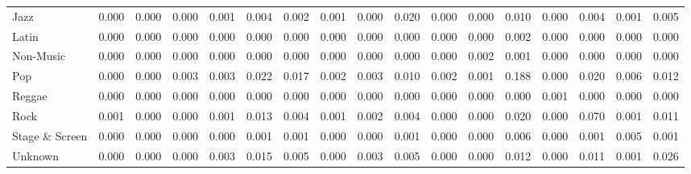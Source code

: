 \begin{table}
\begin{tabular}{lrrrrrrrrrrrrrrrr}
                  Jazz &  0.000 &             0.000 &       0.000 &      0.001 &       0.004 &                   0.002 &        0.001 &    0.000 & 0.020 &  0.000 &      0.000 & 0.010 &   0.000 & 0.004 &           0.001 &    0.005 \\
                 Latin &  0.000 &             0.000 &       0.000 &      0.000 &       0.000 &                   0.000 &        0.000 &    0.000 & 0.000 &  0.000 &      0.000 & 0.002 &   0.000 & 0.000 &           0.000 &    0.000 \\
             Non-Music &  0.000 &             0.000 &       0.000 &      0.000 &       0.000 &                   0.000 &        0.000 &    0.000 & 0.000 &  0.000 &      0.002 & 0.001 &   0.000 & 0.000 &           0.000 &    0.000 \\
                   Pop &  0.000 &             0.000 &       0.003 &      0.003 &       0.022 &                   0.017 &        0.002 &    0.003 & 0.010 &  0.002 &      0.001 & 0.188 &   0.000 & 0.020 &           0.006 &    0.012 \\
                Reggae &  0.000 &             0.000 &       0.000 &      0.000 &       0.000 &                   0.000 &        0.000 &    0.000 & 0.000 &  0.000 &      0.000 & 0.000 &   0.001 & 0.000 &           0.000 &    0.000 \\
                  Rock &  0.001 &             0.000 &       0.000 &      0.001 &       0.013 &                   0.004 &        0.001 &    0.002 & 0.004 &  0.000 &      0.000 & 0.020 &   0.000 & 0.070 &           0.001 &    0.011 \\
        Stage \& Screen &  0.000 &             0.000 &       0.000 &      0.000 &       0.001 &                   0.001 &        0.000 &    0.000 & 0.001 &  0.000 &      0.000 & 0.006 &   0.000 & 0.001 &           0.005 &    0.001 \\
               Unknown &  0.000 &             0.000 &       0.000 &      0.003 &       0.015 &                   0.005 &        0.000 &    0.003 & 0.005 &  0.000 &      0.000 & 0.012 &   0.000 & 0.011 &           0.001 &    0.026 \\
\bottomrule
\end{tabular}
\end{table}
